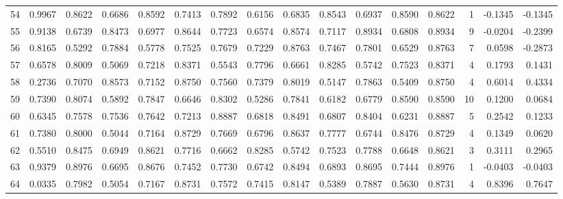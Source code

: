 \begin{tabular}{lrrrrrrrrrrrrrrr}
54  &      0.9967 &  0.8622 &  0.6686 &  0.8592 &  0.7413 &  0.7892 &  0.6156 &  0.6835 &  0.8543 &  0.6937 &   0.8590 &     0.8622 &      1 &                   -0.1345 &                    -0.1345 \\
55  &      0.9138 &  0.6739 &  0.8473 &  0.6977 &  0.8644 &  0.7723 &  0.6574 &  0.8574 &  0.7117 &  0.8934 &   0.6808 &     0.8934 &      9 &                   -0.0204 &                    -0.2399 \\
56  &      0.8165 &  0.5292 &  0.7884 &  0.5778 &  0.7525 &  0.7679 &  0.7229 &  0.8763 &  0.7467 &  0.7801 &   0.6529 &     0.8763 &      7 &                    0.0598 &                    -0.2873 \\
57  &      0.6578 &  0.8009 &  0.5069 &  0.7218 &  0.8371 &  0.5543 &  0.7796 &  0.6661 &  0.8285 &  0.5742 &   0.7523 &     0.8371 &      4 &                    0.1793 &                     0.1431 \\
58  &      0.2736 &  0.7070 &  0.8573 &  0.7152 &  0.8750 &  0.7560 &  0.7379 &  0.8019 &  0.5147 &  0.7863 &   0.5409 &     0.8750 &      4 &                    0.6014 &                     0.4334 \\
59  &      0.7390 &  0.8074 &  0.5892 &  0.7847 &  0.6646 &  0.8302 &  0.5286 &  0.7841 &  0.6182 &  0.6779 &   0.8590 &     0.8590 &     10 &                    0.1200 &                     0.0684 \\
60  &      0.6345 &  0.7578 &  0.7536 &  0.7642 &  0.7213 &  0.8887 &  0.6818 &  0.8491 &  0.6807 &  0.8404 &   0.6231 &     0.8887 &      5 &                    0.2542 &                     0.1233 \\
61  &      0.7380 &  0.8000 &  0.5044 &  0.7164 &  0.8729 &  0.7669 &  0.6796 &  0.8637 &  0.7777 &  0.6744 &   0.8476 &     0.8729 &      4 &                    0.1349 &                     0.0620 \\
62  &      0.5510 &  0.8475 &  0.6949 &  0.8621 &  0.7716 &  0.6662 &  0.8285 &  0.5742 &  0.7523 &  0.7788 &   0.6648 &     0.8621 &      3 &                    0.3111 &                     0.2965 \\
63  &      0.9379 &  0.8976 &  0.6695 &  0.8676 &  0.7452 &  0.7730 &  0.6742 &  0.8494 &  0.6893 &  0.8695 &   0.7444 &     0.8976 &      1 &                   -0.0403 &                    -0.0403 \\
64  &      0.0335 &  0.7982 &  0.5054 &  0.7167 &  0.8731 &  0.7572 &  0.7415 &  0.8147 &  0.5389 &  0.7887 &   0.5630 &     0.8731 &      4 &                    0.8396 &                     0.7647 \\

\end{tabular}
